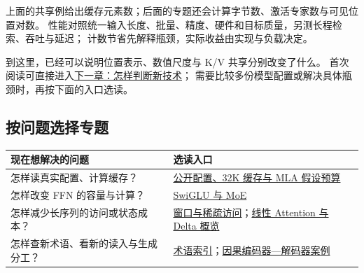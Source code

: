 \begin{boundarybox}[title={适用条件：结构计数与实际性能}]
上面的共享例给出缓存元素数；后面的专题还会计算字节数、激活专家数与可见位置对数。
性能对照统一输入长度、批量、精度、硬件和目标质量，另测长程检索、吞吐与延迟；
计数节省先解释瓶颈，实际收益由实现与负载决定。
\end{boundarybox}

\label{route:modern-core-end}

\par\smallskip
到这里，已经可以说明位置表示、数值尺度与 K/V 共享分别改变了什么。
首次阅读可直接进入\hyperref[intro:evaluating-models]{下一章：怎样判断新技术}；
需要比较多份模型配置或解决具体瓶颈时，再按下面的入口选读。

\subsection*{按问题选择专题}
\begin{center}\small
{}
\begin{tabularx}{\linewidth}{@{}p{53mm}X@{}}
\toprule
现在想解决的问题 & 选读入口\\\midrule
怎样读真实配置、计算缓存？ & \hyperref[sec:modern-config-budget]{公开配置、32K 缓存与 MLA 假设预算}\\
怎样改变 FFN 的容量与计算？ & \hyperref[elective:architecture-extras]{SwiGLU 与 MoE}\\
怎样减少长序列的访问或状态成本？ & \hyperref[sec:modern-sparse-access]{窗口与稀疏访问}；\hyperref[sec:modern-linear-state]{线性 Attention 与 Delta 概览}\\
怎样查新术语、看新的读入与生成分工？ & \hyperref[sec:modern-term-index]{术语索引}；\hyperref[elective:causal-encoder-decoder]{因果编码器—解码器案例}\\
\bottomrule
\end{tabularx}
\end{center}


